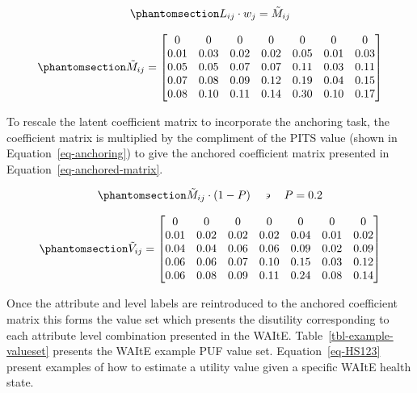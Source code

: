 \documentclass[
  letterpaper,
  DIV=11,
  numbers=noendperiod]{scrartcl}
\begin{document}
\begin{equation}\phantomsection\label{eq-element-wise-multiplication}{
    L_{ij} \cdot  w_{j} = {\tilde{M}}_{ij}
}\end{equation}

\begin{equation}\phantomsection\label{eq-coeff-matrix}{
\tilde{M}_{ij} =  
\begin{bmatrix}
0 & 0 & 0 & 0 & 0 & 0 & 0 \\
0.01 & 0.03 & 0.02 & 0.02 & 0.05 & 0.01 & 0.03 \\
0.05 & 0.05 & 0.07 & 0.07 & 0.11 & 0.03 & 0.11 \\
0.07 & 0.08 & 0.09 & 0.12 & 0.19 & 0.04 & 0.15 \\
0.08 & 0.10 & 0.11 & 0.14 & 0.30 & 0.10 & 0.17
\end{bmatrix}
}\end{equation}

To rescale the latent coefficient matrix to incorporate the anchoring
task, the coefficient matrix is multiplied by the compliment of the PITS
value (shown in Equation~\ref{eq-anchoring}) to give the anchored
coefficient matrix presented in Equation~\ref{eq-anchored-matrix}.

\begin{equation}\phantomsection\label{eq-anchoring}{
    \tilde{M}_{ij} \cdot (1-P) \quad \backepsilon \quad P = 0.2 
}\end{equation}

\begin{equation}\phantomsection\label{eq-anchored-matrix}{
\tilde{V}_{ij} =  
\begin{bmatrix}
0 & 0 & 0 & 0 & 0 & 0 & 0 \\
0.01 & 0.02 & 0.02 & 0.02 & 0.04 & 0.01 & 0.02 \\
0.04 & 0.04 & 0.06 & 0.06 & 0.09 & 0.02 & 0.09 \\
0.06 & 0.06 & 0.07 & 0.10 & 0.15 & 0.03 & 0.12 \\
0.06 & 0.08 & 0.09 & 0.11 & 0.24 & 0.08 & 0.14 \\
\end{bmatrix}
}\end{equation}

Once the attribute and level labels are reintroduced to the anchored
coefficient matrix this forms the value set which presents the
disutility corresponding to each attribute level combination presented
in the WAItE. Table~\ref{tbl-example-valueset} presents the WAItE
example PUF value set. Equation~\ref{eq-HS123} present examples of how
to estimate a utility value given a specific WAItE health state.
\end{document}
